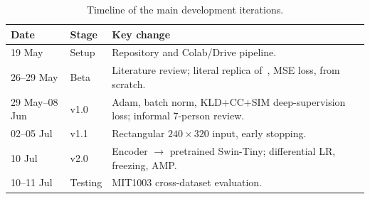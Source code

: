 \begin{table}[t]
\centering
\caption{Timeline of the main development iterations.}
\label{tab:timeline}
\begin{tabular}{@{}p{1.3cm}p{0.9cm}p{5cm}@{}}
\toprule
\textbf{Date} & \textbf{Stage} & \textbf{Key change} \\
\midrule
19 May      & Setup   & Repository and Colab/Drive pipeline. \\
26--29 May  & Beta    & Literature review; literal replica of~\cite{wang2018deep}, MSE loss, from scratch. \\
29 May--08 Jun & v1.0 & Adam, batch norm, KLD+CC+SIM deep-supervision loss; informal 7-person review. \\
02--05 Jul  & v1.1    & Rectangular $240\times320$ input, early stopping. \\
10 Jul      & v2.0    & Encoder $\rightarrow$ pretrained Swin-Tiny; differential LR, freezing, AMP. \\
10--11 Jul  & Testing & MIT1003 cross-dataset evaluation. \\
\bottomrule
\end{tabular}
\end{table}
